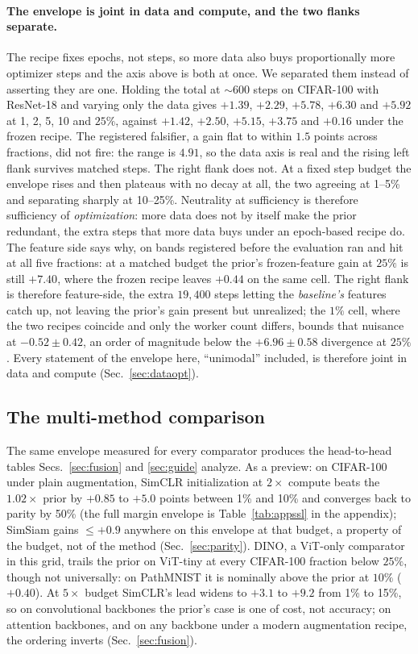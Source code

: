 \paragraph{The envelope is joint in data and compute, and the two flanks
separate.} The recipe fixes epochs, not steps, so more data also buys
proportionally more optimizer steps and the axis above is both at once. We
separated them instead of asserting they are one. Holding the total at
${\sim}600$ steps on CIFAR-100 with ResNet-18 and varying only the data gives
$+1.39$, $+2.29$, $+5.78$, $+6.30$ and $+5.92$ at 1, 2, 5, 10 and $25\%$,
against $+1.42$, $+2.50$, $+5.15$, $+3.75$ and $+0.16$ under the frozen recipe.
The registered falsifier, a gain flat to within $1.5$ points across fractions,
did not fire: the range is $4.91$, so the data axis is real and the rising left
flank survives matched steps. The right flank does not. At a fixed step budget
the envelope rises and then plateaus with no decay at all, the two agreeing at
1--5\% and separating sharply at 10--25\%. Neutrality at sufficiency is
therefore sufficiency of \emph{optimization}: more data does not by itself make
the prior redundant, the extra steps that more data buys under an epoch-based
recipe do. The feature side says why, on bands registered before the evaluation
ran and hit at all five fractions: at a matched budget the prior's
frozen-feature gain at $25\%$ is still $+7.40$, where the frozen recipe leaves
$+0.44$ on the same cell. The right flank is therefore feature-side, the extra
$19{,}400$ steps letting the \emph{baseline's} features catch up, not
leaving the prior's gain present but unrealized; the $1\%$ cell, where the two
recipes coincide and only the worker count differs, bounds that nuisance at
$-0.52 \pm 0.42$, an order of magnitude below the $+6.96 \pm 0.58$ divergence
at $25\%$. Every statement of the envelope here, ``unimodal'' included, is
therefore joint in data and compute (Sec.~\ref{sec:dataopt}).

\subsection{The multi-method comparison}\label{sec:multimethod}
The same envelope measured for every comparator produces the head-to-head
tables Secs.~\ref{sec:fusion} and \ref{sec:guide} analyze. As a preview: on CIFAR-100 under plain augmentation, SimCLR initialization at
$2\times$ compute beats the $1.02\times$ prior by $+0.85$ to $+5.0$ points
between 1\% and 10\% and converges back to parity by 50\% (the full margin
envelope is Table~\ref{tab:appssl} in the appendix); SimSiam gains ${\leq}+0.9$ anywhere on this envelope at
that budget, a property of the
budget, not of the method (Sec.~\ref{sec:parity}). DINO, a ViT-only
comparator in this grid, trails the
prior on ViT-tiny at every CIFAR-100 fraction below $25\%$, though not
universally: on
PathMNIST it is nominally above the prior at $10\%$ ($+0.40$). At $5\times$
budget SimCLR's lead widens to $+3.1$ to
$+9.2$ from 1\% to 15\%, so on convolutional backbones the
prior's case is one of cost, not accuracy; on attention backbones, and on any
backbone under a modern augmentation recipe, the ordering inverts
(Sec.~\ref{sec:fusion}).

